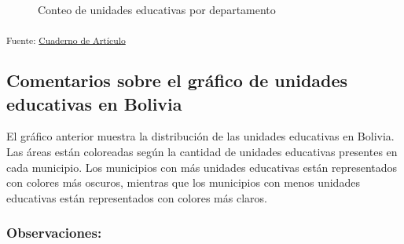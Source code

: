 \documentclass[
  12pt]{article}
\begin{document}
\begin{figure}[H]


\caption{\label{fig-rept2024}Conteo de unidades educativas por
departamento}

\end{figure}%

\textsubscript{Fuente:
\href{https://sociest.github.io/ue-report/index.ipynb.html}{Cuaderno de
Artículo}}

\subsection{Comentarios sobre el gráfico de unidades educativas en
Bolivia}\label{comentarios-sobre-el-gruxe1fico-de-unidades-educativas-en-bolivia}

El gráfico anterior muestra la distribución de las unidades educativas
en Bolivia. Las áreas están coloreadas según la cantidad de unidades
educativas presentes en cada municipio. Los municipios con más unidades
educativas están representados con colores más oscuros, mientras que los
municipios con menos unidades educativas están representados con colores
más claros.

\subsubsection{Observaciones:}\label{observaciones}
\end{document}

